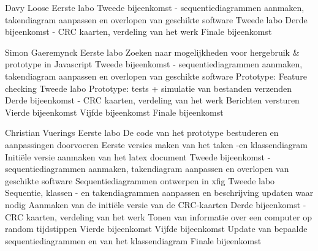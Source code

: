 \documentclass[a4paper,oneside]{report}
\begin{document}
\begin{studentlog}{Davy Loose}
{Eerste labo}
{Tweede bijeenkomst - sequentiediagrammen aanmaken, takendiagram aanpassen en overlopen van geschikte software}
{Tweede labo}
{Derde bijeenkomst - CRC kaarten, verdeling van het werk}
{Finale bijeenkomst}
\end{studentlog}

\begin{studentlog}{Simon Gaeremynck}
{Eerste labo}
{Zoeken naar mogelijkheden voor hergebruik \& prototype in Javascript}
{Tweede bijeenkomst - sequentiediagrammen aanmaken, takendiagram aanpassen en overlopen van geschikte software}
{Prototype: Feature checking}
{Tweede labo}
{Prototype: tests + simulatie van bestanden verzenden}
{Derde bijeenkomst - CRC kaarten, verdeling van het werk}
{Berichten versturen}
{Vierde bijeenkomst}
{Vijfde bijeenkomst}
{Finale bijeenkomst}
\end{studentlog}

\begin{studentlog}{Christian Vuerings}
{Eerste labo}
{De code van het prototype bestuderen en aanpassingen doorvoeren}
{Eerste versies maken van het taken -en klassendiagram}
{Initiële versie aanmaken van het latex document}
{Tweede bijeenkomst - sequentiediagrammen aanmaken, takendiagram aanpassen en overlopen van geschikte software}
{Sequentiediagrammen ontwerpen in xfig}
{Tweede labo}
{Sequentie, klassen - en takendiagrammen aanpassen en beschrijving updaten waar nodig}
{Aanmaken van de initiële versie van de CRC-kaarten}
{Derde bijeenkomst - CRC kaarten, verdeling van het werk}
{Tonen van informatie over een computer op random tijdstippen}   
{Vierde bijeenkomst}
{Vijfde bijeenkomst}
{Update van bepaalde sequentiediagrammen en van het klassendiagram}
{Finale bijeenkomst}
\end{studentlog}

\noindent
\end{document}
